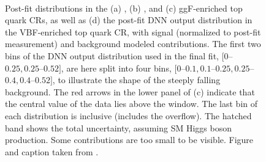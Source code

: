     \begin{figure}[htp]
        \centering
         \\
        \caption[Post-fit \mT distributions in the ggF top-quark control regions.]{
            Post-fit \mT distributions in the (a) \ZeroJet, (b) \OneJet, and (c) ggF-enriched \TwoJet top quark CRs, as well as (d) the post-fit DNN output distribution in the VBF-enriched \TwoJet top quark CR, with signal (normalized to post-fit measurement) and background modeled contributions.
            The first two bins of the DNN output distribution used in the final fit, $[0$--$0.25,0.25$--$0.52]$, are here split into four bins, $[0$--$0.1,0.1$--$0.25,0.25$--$0.4,0.4$--$0.52]$, to illustrate the shape of the steeply falling background.
            The red arrows in the lower panel of (c) indicate that the central value of the data lies above the window. The last bin of each \mT distribution is inclusive (includes the overflow).
            The hatched band shows the total uncertainty, assuming SM Higgs boson production.
            Some contributions are too small to be visible.
            Figure and caption taken from .
            \label{app:fig:Top_CRs}
        }
    \end{figure}

